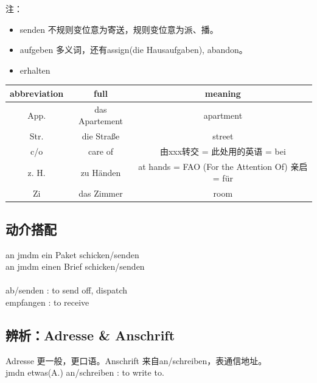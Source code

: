 注：
\begin{itemize}
    \item senden 不规则变位意为寄送，规则变位意为派、播。
    \item aufgeben 多义词，还有assign(die Hausaufgaben), abandon。
    \item erhalten 
\end{itemize}

\begin{center}
    \begin{tabular}{|c|c|c|}
        \hline
        \rowcolor{gray}
        abbreviation & full           & meaning                                        \\
        \hline
        App.         & das Apartement & apartment                                      \\
        \hline
        Str.         & die Straße     & street                                         \\
        \hline
        c/o          & care of        & 由xxx转交 = 此处用的英语 = bei                          \\
        \hline
        z. H.        & zu Händen      & at hands = FAO (For the Attention Of) 亲启 = für \\
        \hline
        Zi           & das Zimmer     & room                                           \\
        \hline
    \end{tabular}
\end{center}

\subsection{动介搭配}
an jmdm ein Paket schicken/senden \\
an jmdm einen Brief schicken/senden \\
\\
ab/senden \cir[color=gray, side=true]: to send off, dispatch \\
empfangen \flower[color=gray]: to receive \\

\subsection{辨析：Adresse \& Anschrift}
Adresse 更一般，更口语。Anschrift 来自an/schreiben，表通信地址。 \\
jmdn etwas(A.) an/schreiben \cir[color=gray]: to write to. \\

